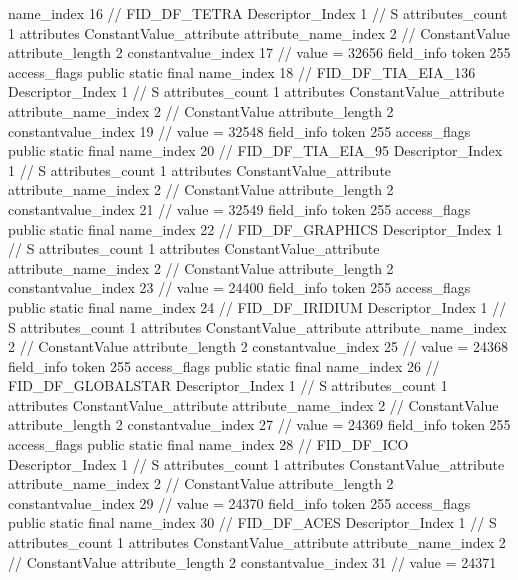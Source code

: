 {{{{{				name_index	16		// FID_DF_TETRA
				Descriptor_Index	1		// S
				attributes_count	1
				attributes {
				ConstantValue_attribute {
					attribute_name_index	2		// ConstantValue
					attribute_length	2
					constantvalue_index	17		// value = 32656
				}
				}
			}
			field_info {
				token	255
				access_flags	public static final
				name_index	18		// FID_DF_TIA_EIA_136
				Descriptor_Index	1		// S
				attributes_count	1
				attributes {
				ConstantValue_attribute {
					attribute_name_index	2		// ConstantValue
					attribute_length	2
					constantvalue_index	19		// value = 32548
				}
				}
			}
			field_info {
				token	255
				access_flags	public static final
				name_index	20		// FID_DF_TIA_EIA_95
				Descriptor_Index	1		// S
				attributes_count	1
				attributes {
				ConstantValue_attribute {
					attribute_name_index	2		// ConstantValue
					attribute_length	2
					constantvalue_index	21		// value = 32549
				}
				}
			}
			field_info {
				token	255
				access_flags	public static final
				name_index	22		// FID_DF_GRAPHICS
				Descriptor_Index	1		// S
				attributes_count	1
				attributes {
				ConstantValue_attribute {
					attribute_name_index	2		// ConstantValue
					attribute_length	2
					constantvalue_index	23		// value = 24400
				}
				}
			}
			field_info {
				token	255
				access_flags	public static final
				name_index	24		// FID_DF_IRIDIUM
				Descriptor_Index	1		// S
				attributes_count	1
				attributes {
				ConstantValue_attribute {
					attribute_name_index	2		// ConstantValue
					attribute_length	2
					constantvalue_index	25		// value = 24368
				}
				}
			}
			field_info {
				token	255
				access_flags	public static final
				name_index	26		// FID_DF_GLOBALSTAR
				Descriptor_Index	1		// S
				attributes_count	1
				attributes {
				ConstantValue_attribute {
					attribute_name_index	2		// ConstantValue
					attribute_length	2
					constantvalue_index	27		// value = 24369
				}
				}
			}
			field_info {
				token	255
				access_flags	public static final
				name_index	28		// FID_DF_ICO
				Descriptor_Index	1		// S
				attributes_count	1
				attributes {
				ConstantValue_attribute {
					attribute_name_index	2		// ConstantValue
					attribute_length	2
					constantvalue_index	29		// value = 24370
				}
				}
			}
			field_info {
				token	255
				access_flags	public static final
				name_index	30		// FID_DF_ACES
				Descriptor_Index	1		// S
				attributes_count	1
				attributes {
				ConstantValue_attribute {
					attribute_name_index	2		// ConstantValue
					attribute_length	2
					constantvalue_index	31		// value = 24371
}}}}}}}
